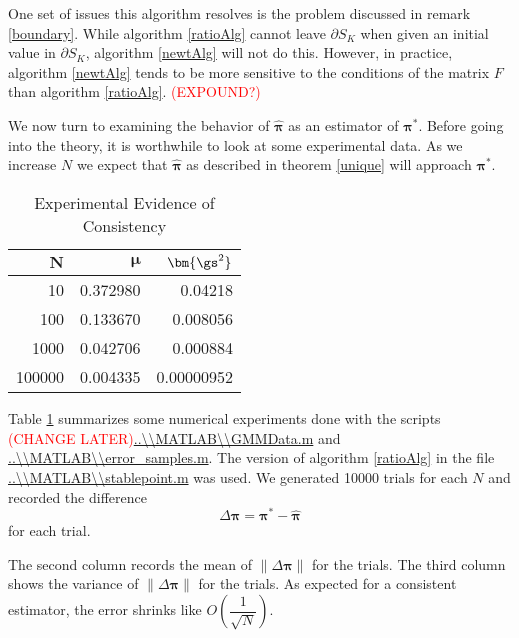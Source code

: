 One set of issues this algorithm resolves is the problem discussed in remark \ref{boundary}.  While algorithm \ref{ratioAlg} cannot leave $\partial S_K$%
 when given an initial value in $\partial S_K$, algorithm \ref{newtAlg} will not do this.  However, in practice, algorithm \ref{newtAlg} tends to be more sensitive to the conditions of the matrix $F$ than algorithm \ref{ratioAlg}. \textcolor{red}{(EXPOUND?)}

We now turn to examining the behavior of $\hat{\bm\pi}$ as an estimator of $\bm\pi^\ast$.  Before going into the theory, it is worthwhile to look at some experimental data. As we increase $N$ we expect that $\hat{\bm\pi}$ as described in theorem \ref{unique} will approach $\bm\pi^\ast$.

\begin{table}[h]
\begin{tabular}{r||r|r}
\toprule
\textbf{$\bm N$} & \textbf{$\bm \mu$} & \textbf{$\bm{\gs^2}$}\\
\midrule
10 & 0.372980 & 0.04218\\
100 & 0.133670 & 0.008056\\
1000 & 0.042706 & 0.000884 \\
100000 & 0.004335 & 0.00000952\\
\bottomrule
\end{tabular}
\caption{Experimental Evidence of Consistency}
\label{exprConsist}
\end{table}

Table \ref{exprConsist} summarizes some numerical experiments done with the scripts \textcolor{red}{(CHANGE LATER)}\url{..\\MATLAB\\GMMData.m} and \url{..\\MATLAB\\error_samples.m}. The version of  algorithm \ref{ratioAlg} in the file \url{..\\MATLAB\\stablepoint.m} was used. We generated 10000 trials for each $N$ and recorded the difference 
\[\Delta\bm\pi=\bm\pi^*-\hat{\bm\pi}\]
 for each trial.  

The second column records the mean of $\|\Delta\bm\pi\|$ for the trials. The third column shows the variance of $\|\Delta\bm\pi\|$ for the trials.  As expected for a consistent estimator, the error shrinks like $O\left(\dfrac{1}{\sqrt{N}}\right)$.
